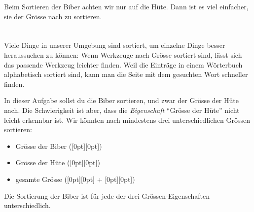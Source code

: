 {{Beim Sortieren der Biber achten wir nur auf die Hüte. Dann ist es viel einfacher, sie der Grösse nach zu sortieren.

{\centering%
\raisebox{-0.5ex}{}    \raisebox{-0.5ex}{}\par}



\section*{\BrochureItsInformatics}
Viele Dinge in unserer Umgebung sind sortiert, um einzelne Dinge besser heraussuchen zu können: Wenn Werkzeuge nach Grösse sortiert sind, lässt sich das passende Werkzeug leichter finden.  Weil die Einträge in einem Wörterbuch alphabetisch sortiert sind, kann man die Seite mit dem gesuchten Wort schneller finden.

In dieser Aufgabe sollst du die Biber sortieren, und zwar der Grösse der Hüte nach. Die Schwierigkeit ist aber, dass die \emph{Eigenschaft} \enquote{Grösse der Hüte} nicht leicht erkennbar ist. Wir könnten nach mindestens drei unterschiedlichen Grössen sortieren:

\begin{itemize}
  \item Grösse der Biber (\raisebox{-0.5ex}[0pt][0pt]{})
  \item Grösse der Hüte (\raisebox{-0.5ex}[0pt][0pt]{})
  \item gesamte Grösse (\raisebox{-0.5ex}[0pt][0pt]{} + \raisebox{-0.5ex}[0pt][0pt]{})
\end{itemize}

{\centering%
\par}

Die Sortierung der Biber ist für jede der drei Grössen-Eigenschaften unterschiedlich.

}}
